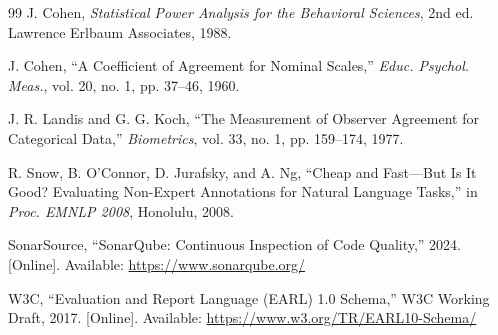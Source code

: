 \documentclass[10pt,conference]{IEEEtran}
\begin{document}
\begin{thebibliography}{99}
  J. Cohen, \textit{Statistical Power Analysis for the Behavioral Sciences},
  2nd ed. Lawrence Erlbaum Associates, 1988.

  J. Cohen, ``A Coefficient of Agreement for Nominal Scales,''
  \textit{Educ. Psychol. Meas.}, vol. 20, no. 1, pp. 37--46, 1960.

  J. R. Landis and G. G. Koch, ``The Measurement of Observer Agreement for
  Categorical Data,'' \textit{Biometrics}, vol. 33, no. 1, pp. 159--174, 1977.

  R. Snow, B. O'Connor, D. Jurafsky, and A. Ng, ``Cheap and Fast---But Is
  It Good? Evaluating Non-Expert Annotations for Natural Language Tasks,''
  in \textit{Proc. EMNLP 2008}, Honolulu, 2008.

  SonarSource, ``SonarQube: Continuous Inspection of Code Quality,''
  2024. [Online]. Available: \url{https://www.sonarqube.org/}

  W3C, ``Evaluation and Report Language (EARL) 1.0 Schema,'' W3C Working
  Draft, 2017. [Online]. Available: \url{https://www.w3.org/TR/EARL10-Schema/}

\end{thebibliography}
\end{document}
